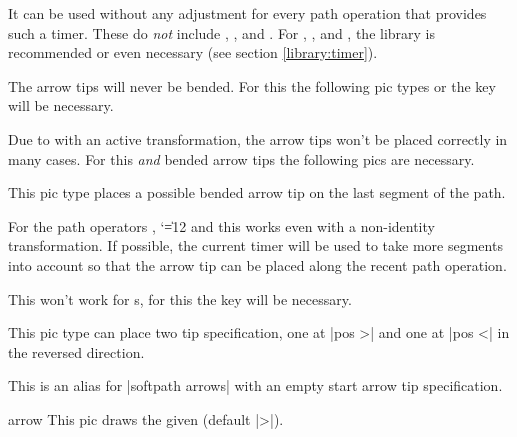 \begin{multicols}{2}
\begin{description}
  It can be used without any adjustment for every path operation that provides such a timer.
  These do \emph{not} include
  ,
  ,
   and
  .
  For ,
      ,
       and
      ,
  the  library is recommended or even necessary
  (see section \ref{library:timer}).
  
  The arrow tips will never be bended. For this the following pic types
  or the  key will be necessary.

  Due to \cite{PgfIssueSloped} with an active transformation,
  the arrow tips won't be placed correctly in many cases.
  For this \emph{and} bended arrow tips the following pics are necessary.
  
\item[|softpath arrows|]
  This pic type places a possible bended arrow tip on the last segment of the path.
  
  For the path operators ,
  {\catcode`\|=12 
              and }
  this works even with a non-identity transformation.
  If possible, the current timer will be used to take more segments into account so
  that the arrow tip can be placed along the recent path operation.
  
  This won't work for s,
  for this the  key will be necessary.
  
  This pic type can place two tip specification,
  one at |pos >| and one at |pos <| in the reversed direction.

\item[|softpath arrow|]
  This is an alias for |softpath arrows| with an empty start arrow tip specification.

%  
%
\end{description}
\begin{pictype}{arrow}{}
  This pic draws the given  (default |>|).
  

\end{pictype}
\end{multicols}
